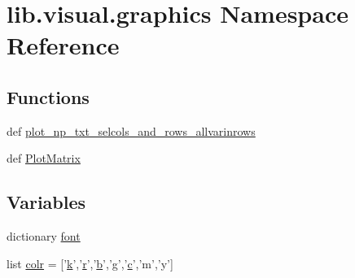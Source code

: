 \hypertarget{a00150}{\section{lib.\-visual.\-graphics Namespace Reference}
\label{a00150}
}
\subsection*{Functions}
\begin{DoxyCompactItemize}
\item 
def \hyperlink{a00150_aa27c34e948992165c7a98e5ca3605549}{plot\-\_\-np\-\_\-txt\-\_\-selcols\-\_\-and\-\_\-rows\-\_\-allvarinrows}
\item 
def \hyperlink{a00150_a99e047c066345a973bfbb527e8a91085}{Plot\-Matrix}
\end{DoxyCompactItemize}
\subsection*{Variables}
\begin{DoxyCompactItemize}
\item 
dictionary \hyperlink{a00150_a3c83ccb4d4d1fcb0ea5f6b8616a1d0df}{font}
\item 
list \hyperlink{a00150_aae94b6a9df961a260c0fa476e2b4693a}{colr} = \mbox{[}'\hyperlink{a00110_abf70355c2e58f64c6b18bda1b9bccfd7}{k}','\hyperlink{a00031_ac862e7284527eb913b1351c8bfb8e079}{r}','\hyperlink{a00035_a50b4f3ddde10830a3976c71083aaee3f}{b}','g','\hyperlink{a00035_a6be92348ba85ef257b11d06209e1d7b6}{c}','m','y'\mbox{]}
\end{DoxyCompactItemize}


